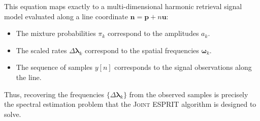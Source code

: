 This equation maps exactly to a multi-dimensional harmonic retrieval signal model evaluated along a line coordinate $\boldsymbol{n} = \mathbf{p} + n \mathbf{u}$:
\begin{itemize}
    \item The mixture probabilities $\pi_k$ correspond to the amplitudes $a_k$.
    \item The scaled rates $\Delta \boldsymbol{\lambda}_k$ correspond to the spatial frequencies $\boldsymbol{\omega}_k$.
    \item The sequence of samples $y[n]$ corresponds to the signal observations along the line.
\end{itemize}

Thus, recovering the frequencies $\{\Delta \boldsymbol{\lambda}_k\}$ from the observed samples is precisely the spectral estimation problem that the \textsc{Joint ESPRIT} algorithm is designed to solve.